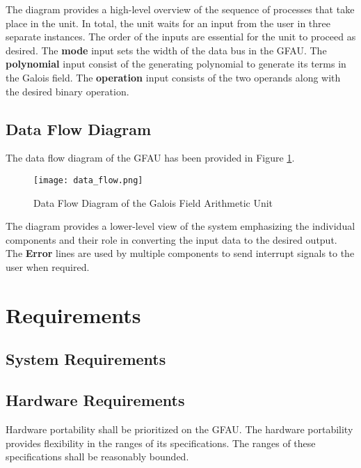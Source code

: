 \documentclass[paper=usletter, fontsize=12pt]{article}
\newcommand{\team}{Galois Field Arithmetic Unit}
\begin{document}
        The diagram provides a high-level overview of the sequence of processes that take place in the unit. In total, the unit waits for an input from the user in three separate instances. The order of the inputs are essential for the unit to proceed as desired. The \textbf{mode} input sets the width of the data bus in the GFAU. The \textbf{polynomial} input consist of the generating polynomial to generate its terms in the Galois field. The \textbf{operation} input consists of the two operands along with the desired binary operation.
        \newpage

        \subsection{Data Flow Diagram}
        The data flow diagram of the GFAU has been provided in Figure \ref{fig:data_flow}.

        \begin{figure}[ht]
            \begin{center}
                \texttt{[image: data\_flow.png]}
                \caption{Data Flow Diagram of the \team~} \label{fig:data_flow}
            \end{center}
        \end{figure}

        The diagram provides a lower-level view of the system emphasizing the individual components and their role in converting the input data to the desired output. The \textbf{Error} lines are used by multiple components to send interrupt signals to the user when required.

    \section{Requirements}

        \subsection{System Requirements}

        \subsection{Hardware Requirements}
        Hardware portability shall be prioritized on the GFAU. The hardware portability provides flexibility in the ranges of its specifications. The ranges of these specifications shall be reasonably bounded.
\end{document}
